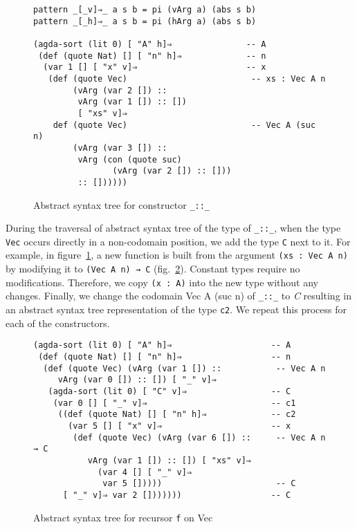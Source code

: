 \documentclass[sigplan,10pt]{acmart}
\begin{document}
\begin{figure}
\begin{center}
\begingroup
\fontsize{7pt}{9pt}\selectfont
\begin{Verbatim}
pattern _[_v]⇒_ a s b = pi (vArg a) (abs s b)
pattern _[_h]⇒_ a s b = pi (hArg a) (abs s b)

(agda-sort (lit 0) [ "A" h]⇒               -- A
 (def (quote Nat) [] [ "n" h]⇒             -- n
  (var 1 [] [ "x" v]⇒                      -- x
   (def (quote Vec)                         -- xs : Vec A n
        (vArg (var 2 []) ::
         vArg (var 1 []) :: [])
         [ "xs" v]⇒
    def (quote Vec)                         -- Vec A (suc n)
        (vArg (var 3 []) ::
         vArg (con (quote suc)
                (vArg (var 2 []) :: []))
         :: [])))))
\end{Verbatim}
\endgroup
\end{center}
\caption{Abstract syntax tree for constructor {\tt \_::\_}}
\label{fig:ast-g}
\end{figure}


During the traversal of abstract syntax tree of the type of {\tt \_::\_}, when the type {\tt Vec} occurs directly in a non-codomain position, we add the type {\tt C} next to it. For example, in figure~\ref{fig:ast-g}, a new function is built from the argument {\tt (xs : Vec A n)} by modifying it to {\tt (Vec A n) → C} (fig.~\ref{fig:ast-d}). Constant types require no modifications. Therefore, we copy {\tt (x : A)} into the new type without any changes. Finally, we change the codomain {Vec A (suc n)} of {\tt \_::\_} to \emph{C} resulting in an abstract syntax tree representation of the type {\tt c2}. We repeat this process for each of the constructors.

\begin{figure}
\begin{center}
\begingroup
\fontsize{7pt}{9pt}\selectfont
\begin{Verbatim}
(agda-sort (lit 0) [ "A" h]⇒                    -- A
 (def (quote Nat) [] [ "n" h]⇒                  -- n
  (def (quote Vec) (vArg (var 1 []) ::           -- Vec A n
     vArg (var 0 []) :: []) [ "_" v]⇒
   (agda-sort (lit 0) [ "C" v]⇒                 -- C
    (var 0 [] [ "_" v]⇒                         -- c1
     ((def (quote Nat) [] [ "n" h]⇒             -- c2
       (var 5 [] [ "x" v]⇒                      -- x
        (def (quote Vec) (vArg (var 6 []) ::     -- Vec A n → C
           vArg (var 1 []) :: []) [ "xs" v]⇒  
             (var 4 [] [ "_" v]⇒ 
              var 5 []))))                       -- C
      [ "_" v]⇒ var 2 []))))))                  -- C
\end{Verbatim}
\endgroup
\end{center}
\caption{Abstract syntax tree for recursor {\tt f} on Vec}
\label{fig:ast-d}
\end{figure}
\normalsize
\end{document}

